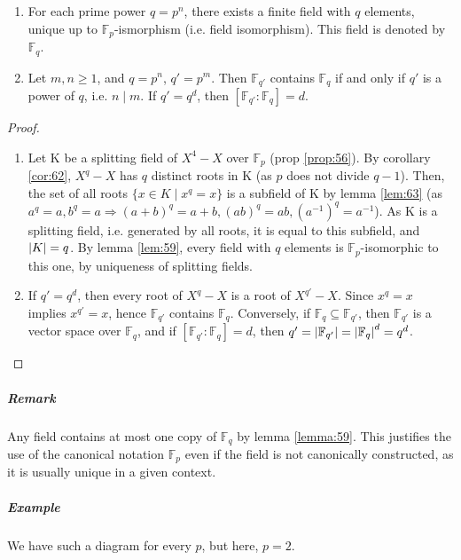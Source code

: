 \begin{theorem}
  \label{thm:65}
  \begin{enumerate}
  \item For each prime power $q = p^n$, there exists a finite field with $q$ elements, unique up to $\mathbb{F}_p$-ismorphism (i.e. field isomorphism). This field is denoted by $\mathbb{F}_q$.
  \item Let $m, n \geq 1$, and $q = p^n$, $q' = p^m$. Then $\mathbb{F}_{q'}$ contains $\mathbb{F}_q$ if and only if $q'$ is a power of $q$, i.e. $n \mid m$. If  $q' = q^d$, then $[\mathbb{F}_{q'} : \mathbb{F}_{q}] = d$.
  \end{enumerate}
\end{theorem}

\begin{proof}
  \begin{enumerate}
  \item Let K be a splitting field of $X^4-X$ over $\mathbb{F}_p$ (prop \ref{prop:56}). By corollary \ref{cor:62}, $X^q-X$ has $q$ distinct roots in K (as $p$ does not divide $q-1$). Then, the set of all roots $\{ x \in K \mid x^q = x\}$ is a subfield of K by lemma \ref{lem:63} (as $a^q = a, b^q = a \Rightarrow (a+b)^q = a + b, (ab)^q = ab, \left(a^{-1}\right)^q = a^{-1}$). As K is a splitting field, i.e. generated by all roots, it is equal to this subfield, and $\left|K\right| = q$. By lemma \ref{lem:59}, every field with $q$ elements is $\mathbb{F}_p$-isomorphic to this one, by uniqueness of splitting fields.

  \item If $q' = q^d$, then every root of $X^q-X$ is a root of $X^{q'}-X$. Since $x^q = x$ implies $x^{q'} = x$, hence $\mathbb{F}_{q'}$ contains $\mathbb{F}_{q}$. Conversely, if $\mathbb{F}_q \subseteq \mathbb{F}_{q'}$, then $\mathbb{F}_{q'}$ is a vector space over $\mathbb{F}_q$, and if $[\mathbb{F}_{q'} : \mathbb{F}_q] = d$, then $q' = \left|\mathbb{F}_{q'}\right| = \left|\mathbb{F}_q\right|^d = q^d$.
  \end{enumerate}
\end{proof}

\subparagraph{Remark}

Any field contains at most one copy of $\mathbb{F}_q$ by lemma \ref{lemma:59}. This justifies the use of the canonical notation $\mathbb{F}_p$ even if the field is not canonically constructed, as it is usually unique in a given context.

\subparagraph{Example}

We have such a diagram for every $p$, but here, $p = 2$.

